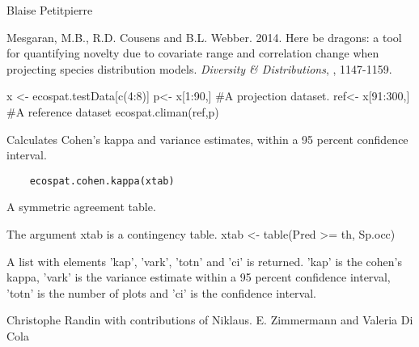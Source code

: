 \documentclass[a4paper]{book}
\begin{document}
%
\begin{Author}\relax
Blaise Petitpierre 
\end{Author}
%
\begin{References}\relax
Mesgaran, M.B., R.D. Cousens and B.L. Webber. 2014. Here be dragons: a tool for quantifying novelty due to covariate range and correlation change when projecting species distribution models. \emph{Diversity \& Distributions}, , 1147-1159.
\end{References}
%
\begin{Examples}
\begin{ExampleCode}
x <- ecospat.testData[c(4:8)]
p<- x[1:90,] #A projection dataset.
ref<- x[91:300,] #A reference dataset
ecospat.climan(ref,p)

\end{ExampleCode}
\end{Examples}
%
\begin{Description}\relax
Calculates Cohen's kappa and variance estimates, within a 95 percent confidence interval.
\end{Description}
%
\begin{Usage}
\begin{verbatim}
    ecospat.cohen.kappa(xtab)
\end{verbatim}
\end{Usage}
%
\begin{Arguments}
\begin{ldescription}
\item[\code{xtab}] 
A symmetric agreement table.


\end{ldescription}
\end{Arguments}
%
\begin{Details}\relax
The argument xtab is a contingency table.
xtab <- table(Pred >= th, Sp.occ)
\end{Details}
%
\begin{Value}
A list with elements 'kap', 'vark', 'totn' and 'ci' is returned. 
'kap' is the cohen's kappa, 'vark' is the variance estimate within a 95 percent confidence interval, 'totn' is the number of plots and 'ci' is the confidence interval. 
\end{Value}
%
\begin{Author}\relax
Christophe Randin  with contributions of Niklaus. E. Zimmermann  and Valeria Di Cola 
\end{Author}
\end{document}
